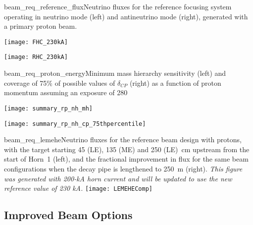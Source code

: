 \begin{cdrfigure}{beam_req_reference_flux}{Neutrino fluxes for the reference 
    focusing system operating in neutrino mode (left) and antineutrino 
    mode (right), generated with a  %
    primary proton beam.} 
\centering 
\begin{minipage}{0.45\textwidth}
\centering 
\texttt{[image: FHC\_230kA]}
\end{minipage}\hfill 
\begin{minipage}{0.45\textwidth}
\centering 
\texttt{[image: RHC\_230kA]}
\end{minipage}
\end{cdrfigure}

\begin{cdrfigure}{beam_req_proton_energy}{Minimum mass hierarchy
    sensitivity (left) and 
    coverage of 75\% of possible values of $\delta_{CP}$ (right) as a
    function of proton momentum assuming an exposure of \num{280}~\ktyr}
\centering 
\begin{minipage}{0.45\textwidth}
\centering 
\texttt{[image: summary\_rp\_nh\_mh]}
\end{minipage}\hfill 
\begin{minipage}{0.45\textwidth}
\centering 
\texttt{[image: summary\_rp\_nh\_cp\_75thpercentile]}
\end{minipage}
\end{cdrfigure}

\begin{cdrfigure} {beam_req_lemehe}{Neutrino fluxes for the 
    reference beam design with  protons, with the target starting 45 (LE), 135 (ME) 
    and 250 (LE)~cm upstream from the start of Horn~1 (left), and the 
   fractional improvement in flux for the same beam configurations 
    when the decay pipe is lengthened to 250~m (right). {\it This 
      figure was generated with 200-kA horn current and will be 
      updated to use the new reference value of 230 kA.}}
    \texttt{[image: LEMEHEComp]}
  \end{cdrfigure}

\subsection{Improved Beam Options}
\label{sec:alternative-focusing-systems}

